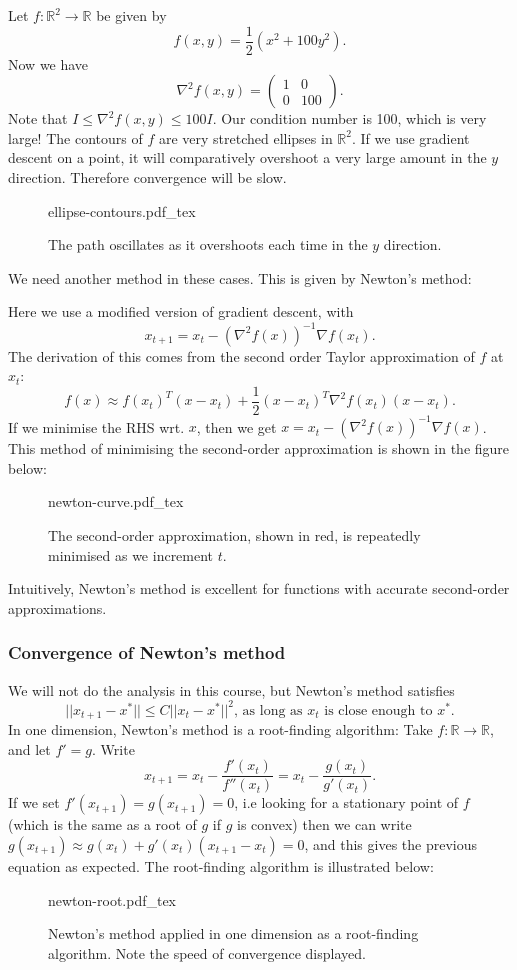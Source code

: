 \documentclass[a4paper]{scrartcl}
\newcommand{\incfig}[2]{%
    \def\svgwidth{#1mm}
    {#2.pdf_tex}
}
\begin{document}
\begin{example}
	Let $f: \mathbb{R}^{2} \to \mathbb{R} $ be given by 
	\[f(x,y)=\frac{1}{2}(x^2+100y^2).\]
	Now we have 
	\[\nabla^2 f (x,y)=\begin{pmatrix}
	1&0\\0&100
	\end{pmatrix}
	.\]
	Note that $I\leq \nabla^2 f (x,y)\leq 100I$. Our condition number is 100, which is very large! The contours of $f$ are very stretched ellipses in $\mathbb{R}^2$. If we use gradient descent on a point, it will comparatively overshoot a very large amount in the $y$ direction. Therefore convergence will be slow.
	\begin{figure}[H]
		\centering
		\incfig{70}{ellipse-contours}
		\caption{The path oscillates as it overshoots each time in the $y$ direction.}
	\end{figure}
\end{example}
We need another method in these cases. This is given by Newton's method:
\begin{definition}
	 Here we use a modified version of gradient descent, with 
	 \[x_{t+1}=x_t-(\nabla^2 f (x))^{-1}\nabla f (x_t).\]
	 The derivation of this comes from the second order Taylor approximation of $f$ at $x_t$: 
	 \[f(x)\approx f (x_t)^T (x-x_t)+\frac{1}{2}(x-x_t)^T \nabla^2 f (x_t)(x-x_t).\]
	 If we minimise the RHS wrt. $x$, then we get $x=x_t-(\nabla^2 f(x))^{-1}\nabla f (x)$. This method of minimising the second-order approximation is shown in the figure below:
	 \begin{figure}[H]
		\centering
		\incfig{70}{newton-curve}
		\caption{The second-order approximation, shown in red, is repeatedly minimised as we increment $t$.}
	\end{figure}
	 
\end{definition}
\begin{remark}
	Intuitively, Newton's method is excellent for functions with accurate second-order approximations.
\end{remark}
\subsubsection{Convergence of Newton's method}
We will not do the analysis in this course, but Newton's method satisfies 
\[||x_{t+1}-x^*||\leq C ||x_t-x^*||^2 \text{, as long as } x_t \text{ is close enough to } x^*.\]
In one dimension, Newton's method is a root-finding algorithm:\newline 
Take $f: \mathbb{R} \to \mathbb{R}$, and let $f'=g$. Write 
\[x_{t+1}=x_t-\frac{f'(x_t)}{f'' (x_t)}=x_t-\frac{g (x_t)}{g' (x_t)}.\]
If we set $f'(x_{t+1})=g (x_{t+1})=0$, i.e looking for a stationary point of $f$ (which is the same as a root of $g$ if $g$ is convex) then we can write $g (x_{t+1})\approx g (x_{t})+g' (x_t)(x_{t+1}-x_t)=0$, and this gives the previous equation as expected. The root-finding algorithm is illustrated below:
\begin{figure}[H]
	\centering
	\incfig{70}{newton-root}
	\caption{Newton's method applied in one dimension as a root-finding algorithm. Note the speed of convergence displayed.}
\end{figure}
\end{document}
